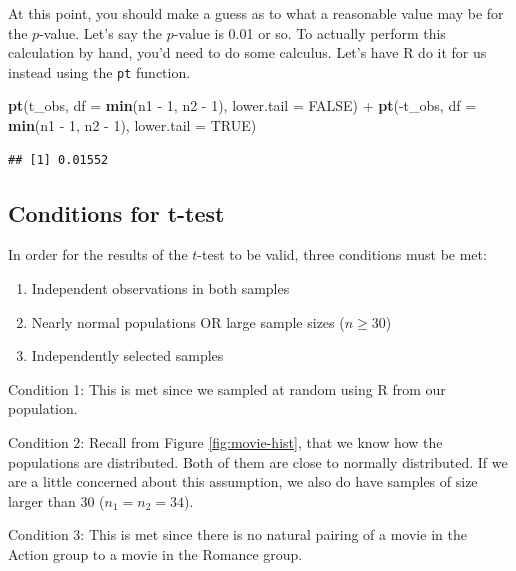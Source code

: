 \documentclass[]{tufte-book}
\newenvironment{Shaded}{\begin{snugshade}}{\end{snugshade}}
\newcommand{\KeywordTok}[1]{\textcolor[rgb]{0.13,0.29,0.53}{\textbf{{#1}}}}
\newcommand{\DataTypeTok}[1]{\textcolor[rgb]{0.13,0.29,0.53}{{#1}}}
\newcommand{\DecValTok}[1]{\textcolor[rgb]{0.00,0.00,0.81}{{#1}}}
\newcommand{\StringTok}[1]{\textcolor[rgb]{0.31,0.60,0.02}{{#1}}}
\newcommand{\OtherTok}[1]{\textcolor[rgb]{0.56,0.35,0.01}{{#1}}}
\newcommand{\NormalTok}[1]{{#1}}
\providecommand{\tightlist}{%
  \setlength{\itemsep}{0pt}\setlength{\parskip}{0pt}}
\begin{document}
At this point, you should make a guess as to what a reasonable value may
be for the \(p\)-value. Let's say the \(p\)-value is 0.01 or so. To
actually perform this calculation by hand, you'd need to do some
calculus. Let's have R do it for us instead using the \texttt{pt}
function.

\begin{Shaded}
\begin{Highlighting}[]
\KeywordTok{pt}\NormalTok{(t_obs, }\DataTypeTok{df =} \KeywordTok{min}\NormalTok{(n1 -}\StringTok{ }\DecValTok{1}\NormalTok{, n2 -}\StringTok{ }\DecValTok{1}\NormalTok{), }\DataTypeTok{lower.tail =} \OtherTok{FALSE}\NormalTok{) +}
\StringTok{  }\KeywordTok{pt}\NormalTok{(-t_obs, }\DataTypeTok{df =} \KeywordTok{min}\NormalTok{(n1 -}\StringTok{ }\DecValTok{1}\NormalTok{, n2 -}\StringTok{ }\DecValTok{1}\NormalTok{), }\DataTypeTok{lower.tail =} \OtherTok{TRUE}\NormalTok{)}
\end{Highlighting}
\end{Shaded}

\begin{verbatim}
## [1] 0.01552
\end{verbatim}

\subsection{Conditions for t-test}\label{conditions-for-t-test}

In order for the results of the \(t\)-test to be valid, three conditions
must be met:

\begin{enumerate}
\def\labelenumi{\arabic{enumi}.}
\tightlist
\item
  Independent observations in both samples
\item
  Nearly normal populations OR large sample sizes (\(n \ge 30\))
\item
  Independently selected samples
\end{enumerate}

Condition 1: This is met since we sampled at random using R from our
population.

Condition 2: Recall from Figure \ref{fig:movie-hist}, that we know how
the populations are distributed. Both of them are close to normally
distributed. If we are a little concerned about this assumption, we also
do have samples of size larger than 30 (\(n_1 = n_2 = 34\)).

Condition 3: This is met since there is no natural pairing of a movie in
the Action group to a movie in the Romance group.
\end{document}
